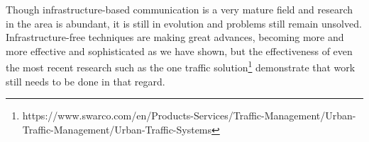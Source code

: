 \documentclass[conference]{IEEEtran}
\begin{document}
Though infrastructure-based communication is a very mature field and research in the area is abundant, it is still in evolution and problems still remain unsolved. Infrastructure-free techniques are making great advances, becoming more and more effective and sophisticated as we have shown, but the effectiveness of even the most recent research such as the one traffic solution\footnote{https://www.swarco.com/en/Products-Services/Traffic-Management/Urban-Traffic-Management/Urban-Traffic-Systems} demonstrate that work still needs to be done in that regard.



\end{document}
